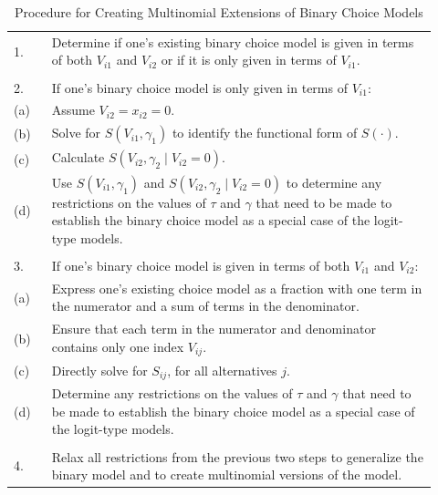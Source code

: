 \begin{table}[h!]
\centering
\caption{Procedure for Creating Multinomial Extensions of Binary Choice Models}
\label{table:procedure_for_creating_multinomial_extensions}
\begin{tabular}{| l K{0.915\linewidth} |}
\hline

1. & Determine if one's existing binary choice model is given in terms of both $V_{i1}$ and $V_{i2}$ or if it is only given in terms of $V_{i1}$.  \\
{} & {} \\

2. &  If one's binary choice model is only given in terms of $V_{i1}$: \\
\hphantom{2.}(a) & Assume $V_{i2} = x_{i2} = 0$. \\
\hphantom{2.}(b) & Solve for $S \left( V_{i1}, \gamma _1 \right)$ to identify the functional form of $S \left( \cdot \right)$. \\
\hphantom{2.}(c) & Calculate $S \left( V_{i2}, \gamma _2 \mid V_{i2} = 0 \right)$. \\
\hphantom{2.}(d) & Use $S \left( V_{i1}, \gamma _1 \right)$ and $S \left( V_{i2}, \gamma _2 \mid V_{i2} = 0 \right)$ to determine any restrictions on the values of $\tau$ and $\gamma$ that need to be made to establish the binary choice model as a special case of the logit-type models. \\
{} & {} \\

3. & If one's binary choice model is given in terms of both $V_{i1}$ and $V_{i2}$: \\ 
\hphantom{3.}(a) & Express one's existing choice model as a fraction with one term in the numerator and a sum of terms in the denominator. \\
\hphantom{3.}(b) & Ensure that each term in the numerator and denominator contains only one index $V_{ij}$. \\
\hphantom{3.}(c) & Directly solve for $S_{ij}$, for all alternatives $j$. \\
\hphantom{3.}(d) & Determine any restrictions on the values of $\tau$ and $\gamma$ that need to be made to establish the binary choice model as a special case of the logit-type models. \\
{} & {} \\

4. & Relax all restrictions from the previous two steps to generalize the binary model and to create multinomial versions of the model. \\

\hline 
\end{tabular}
\end{table}


